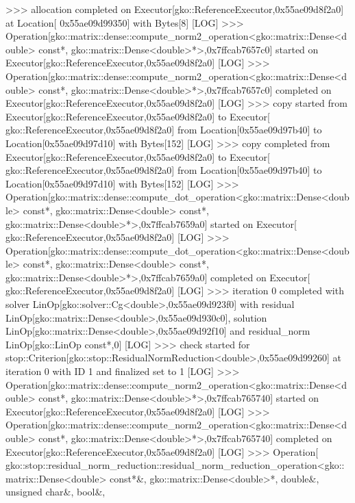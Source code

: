\begin{DoxyCode}
[LOG] >>> allocation completed on Executor[gko::ReferenceExecutor,0x55ae09d8f2a0] at Location[
      0x55ae09d99350] with Bytes[8]
[LOG] >>> Operation[gko::matrix::dense::compute\_norm2\_operation<gko::matrix::Dense<double> \textcolor{keyword}{const}*, 
      gko::matrix::Dense<double>*>,0x7ffcab7657c0] started on Executor[gko::ReferenceExecutor,0x55ae09d8f2a0]
[LOG] >>> Operation[gko::matrix::dense::compute\_norm2\_operation<gko::matrix::Dense<double> \textcolor{keyword}{const}*, 
      gko::matrix::Dense<double>*>,0x7ffcab7657c0] completed on Executor[gko::ReferenceExecutor,0x55ae09d8f2a0]
[LOG] >>> copy started from Executor[gko::ReferenceExecutor,0x55ae09d8f2a0] to Executor[
      gko::ReferenceExecutor,0x55ae09d8f2a0] from Location[0x55ae09d97b40] to Location[0x55ae09d97d10] with Bytes[152]
[LOG] >>> copy completed from Executor[gko::ReferenceExecutor,0x55ae09d8f2a0] to Executor[
      gko::ReferenceExecutor,0x55ae09d8f2a0] from Location[0x55ae09d97b40] to Location[0x55ae09d97d10] with Bytes[152]
[LOG] >>> Operation[gko::matrix::dense::compute\_dot\_operation<gko::matrix::Dense<double> \textcolor{keyword}{const}*, 
      gko::matrix::Dense<double> \textcolor{keyword}{const}*, gko::matrix::Dense<double>*>,0x7ffcab7659a0] started on Executor[
      gko::ReferenceExecutor,0x55ae09d8f2a0]
[LOG] >>> Operation[gko::matrix::dense::compute\_dot\_operation<gko::matrix::Dense<double> \textcolor{keyword}{const}*, 
      gko::matrix::Dense<double> \textcolor{keyword}{const}*, gko::matrix::Dense<double>*>,0x7ffcab7659a0] completed on Executor[
      gko::ReferenceExecutor,0x55ae09d8f2a0]
[LOG] >>> iteration 0 completed with solver LinOp[gko::solver::Cg<double>,0x55ae09d923f0] with residual 
      LinOp[gko::matrix::Dense<double>,0x55ae09d930c0], solution LinOp[gko::matrix::Dense<double>,0x55ae09d92f10] and
       residual\_norm LinOp[gko::LinOp \textcolor{keyword}{const}*,0]
[LOG] >>> check started \textcolor{keywordflow}{for} stop::Criterion[gko::stop::ResidualNormReduction<double>,0x55ae09d99260] at 
      iteration 0 with ID 1 and finalized \textcolor{keyword}{set} to 1
[LOG] >>> Operation[gko::matrix::dense::compute\_norm2\_operation<gko::matrix::Dense<double> \textcolor{keyword}{const}*, 
      gko::matrix::Dense<double>*>,0x7ffcab765740] started on Executor[gko::ReferenceExecutor,0x55ae09d8f2a0]
[LOG] >>> Operation[gko::matrix::dense::compute\_norm2\_operation<gko::matrix::Dense<double> \textcolor{keyword}{const}*, 
      gko::matrix::Dense<double>*>,0x7ffcab765740] completed on Executor[gko::ReferenceExecutor,0x55ae09d8f2a0]
[LOG] >>> Operation[
      gko::stop::residual\_norm\_reduction::residual\_norm\_reduction\_operation<gko::matrix::Dense<double> \textcolor{keyword}{const}*&, gko::matrix::Dense<double>*, \textcolor{keywordtype}{double}&, \textcolor{keywordtype}{unsigned} \textcolor{keywordtype}{char}&, \textcolor{keywordtype}{bool}&, 

\end{DoxyCode}
